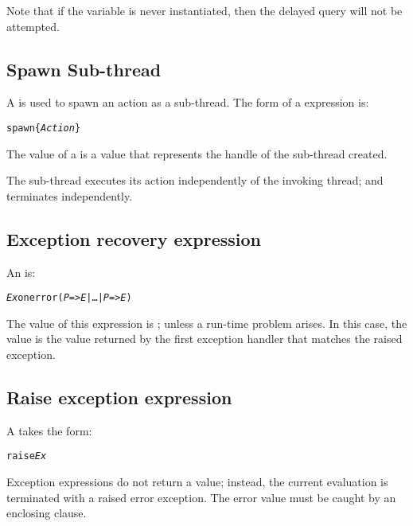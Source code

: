 Note that if the variable is never instantiated, then the delayed query will not be attempted.

\subsection{Spawn Sub-thread}
\label{expression:spawn}

A  is used to spawn an action as a sub-thread. The form of a  expression is:
\begin{alltt}
spawn \{ \emph{Action} \}
\end{alltt}
The value of a  is a  value that represents the handle of the sub-thread created.

The sub-thread executes its action independently of the invoking thread; and terminates independently.

\subsection{Exception recovery expression}
\label{expression:errorrecovery}

An  is:
\begin{alltt}
\emph{Ex} onerror (\emph{P} => \emph{E} | \ldots{} | \emph{P\subn} => \emph{E\subn})
\end{alltt}
The value of this expression is ; unless a run-time problem arises. In this case, the value is the value returned by the first exception handler that matches the raised exception.

\subsection{Raise exception expression}
\label{expression:exception}

A  takes the form:
\begin{alltt}
raise \emph{Ex}
\end{alltt}
Exception expressions do not return a value; instead, the current evaluation is terminated with a raised error exception. The error value  must be caught by an enclosing  clause. 

